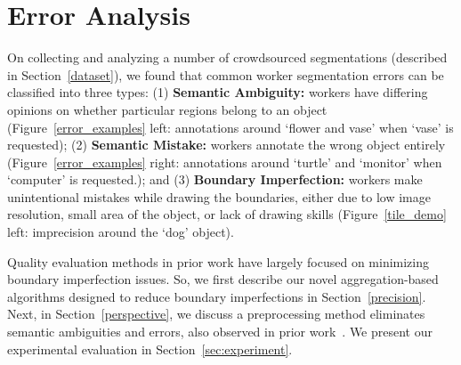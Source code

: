 \vspace{-3pt}
\section{Error Analysis\label{sec:error}}
\par On collecting and analyzing a number of crowdsourced segmentations (described in Section~\ref{dataset}), we found that common worker segmentation errors can be classified into three types: (1) \textbf{Semantic Ambiguity:} workers have differing opinions on whether particular regions belong to an object (Figure~\ref{error_examples} left: annotations around `flower and vase' when `vase' is requested); (2) \textbf{Semantic Mistake:} workers annotate the wrong object entirely (Figure~\ref{error_examples} right: annotations around `turtle' and `monitor' when `computer' is requested.); and (3) \textbf{Boundary Imperfection:} workers make unintentional mistakes while drawing the boundaries, either due to low image resolution, small area of the object, or lack of drawing skills (Figure~\ref{tile_demo} left: imprecision around the `dog' object).
\par Quality evaluation methods in prior work have largely focused on minimizing boundary imperfection issues. So, we first describe our novel aggregation-based algorithms designed to reduce boundary imperfections in Section~\ref{precision}. Next, in Section~\ref{perspective}, we discuss a preprocessing method eliminates semantic ambiguities and errors, also observed in prior work~\cite{Sorokin2008,Lin2014,Gurari2018}. We present our experimental evaluation in Section~\ref{sec:experiment}.%
